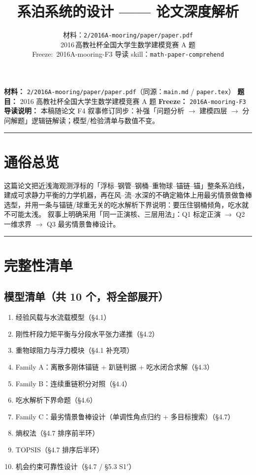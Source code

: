 \documentclass[UTF8,a4paper,zihao=-4]{ctexart}
\title{\textbf{系泊系统的设计 —— 论文深度解析}}
\author{
  材料：\texttt{2/2016A-mooring/paper/paper.pdf}\\[0.3em]
  2016\,高教社杯全国大学生数学建模竞赛 A 题\\[0.2em]
  \small Freeze:~2016A-mooring-F3\quad
  导读 skill：\texttt{math-paper-comprehend}
}
\date{}
\begin{document}
\maketitle
\tableofcontents
\newpage

\textbf{材料：} \texttt{2/2016A-mooring/paper/paper.pdf}（同源：\texttt{main.md} / \texttt{paper.tex}）  
\textbf{题目：} 2016 高教社杯全国大学生数学建模竞赛 A 题  
\textbf{Freeze：} \texttt{2016A-mooring-F3}\\
\textbf{导读说明：} 本稿随论文 F4 叙事修订同步：补强「问题分析 $\to$ 建模四层 $\to$ 分问解题」逻辑链解读；模型/检验清单与数值不变。

\vspace{0.4em}\hrule\vspace{0.4em}

\section{\texorpdfstring{通俗总览}{通俗总览}}

这篇论文把近浅海观测浮标的「浮标--钢管--钢桶--重物球--锚链--锚」整条系泊线，建成可求静力平衡的力学机器，再在风--流--水深的不确定箱体上用最劣情景做鲁棒选型，并用一条与锚链/球重无关的吃水解析下界说明：要压住钢桶倾角，吃水就不可能太浅。
叙事上明确采用「同一正演核、三层用法」：Q1 标定正演 $\to$ Q2 一维求界 $\to$ Q3 最劣情景鲁棒设计。

\vspace{0.4em}\hrule\vspace{0.4em}

\section{\texorpdfstring{完整性清单}{完整性清单}}

\subsection{\texorpdfstring{模型清单（共 10 个，将全部展开）}{模型清单（共 10 个，将全部展开）}}

\begin{enumerate}[leftmargin=1.8em]
\item 经验风载与水流载模型（§4.1）
\item 刚性杆段力矩平衡与分段水平张力递推（§4.2）
\item 重物球阻力与浮力模块（§4.1 补充项）
\item Family A：离散多刚体锚链 + 趴链判据 + 吃水闭合求解（§4.3）
\item Family B：连续重链积分对照（§4.4）
\item 吃水解析下界命题（§4.6）
\item Family C：最劣情景鲁棒设计（单调性角点归约 + 多目标搜索）（§4.7）
\item 熵权法（§4.7 排序前半环）
\item TOPSIS（§4.7 排序后半环）
\item 机会约束可靠性设计（§4.7 / §5.3 S1$'$）
\end{enumerate}
\end{document}
